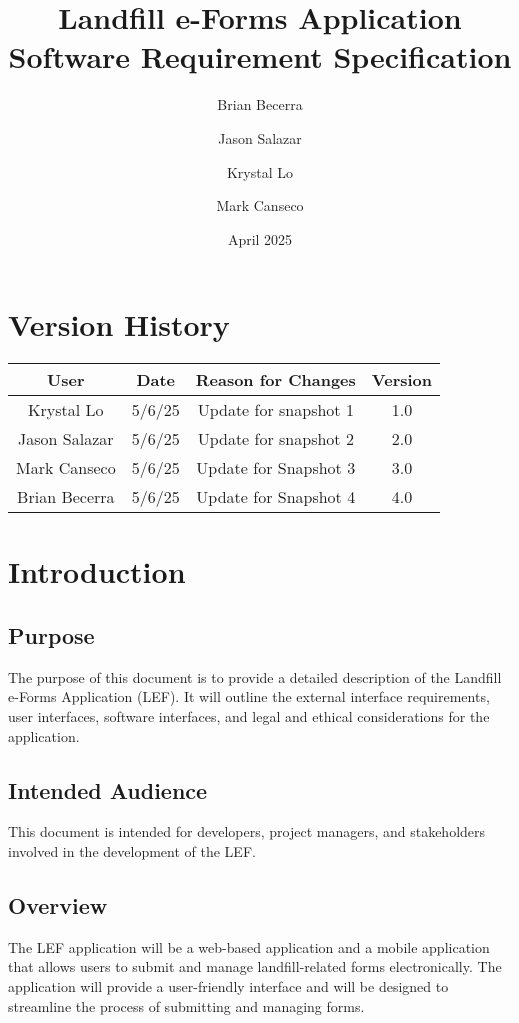 \documentclass[12pt]{article}
\title{Landfill e-Forms Application\\
Software Requirement Specification}
\author{
    Brian Becerra\\
    \and
    Jason Salazar\\
    \and
    Krystal Lo\\
    \and
    Mark Canseco\\
    }
\date{April 2025}
\begin{document}
\begin{titlepage}
\maketitle
\thispagestyle{empty}
\end{titlepage}

\thispagestyle{empty}
\tableofcontents
\newpage

\section*{Version History}
\begin{table}[ht]
    \centering
    \begin{tabular}{|c|c|c|c|}
    \hline
    \textbf{User} & \textbf{Date} & \textbf{Reason for Changes} & \textbf{Version}\\
    \hline
         Krystal Lo & 5/6/25  & Update for snapshot 1 & 1.0\\
    \hline
        Jason Salazar & 5/6/25 & Update for snapshot 2 & 2.0\\
    \hline
         Mark Canseco&  5/6/25& Update for Snapshot 3 & 3.0\\
    \hline
         Brian Becerra& 5/6/25 & Update for Snapshot 4 & 4.0\\
    \hline
    \end{tabular}
\end{table}
\newpage

\section{Introduction}
\subsection{Purpose}
The purpose of this document is to provide a detailed description of the Landfill e-Forms Application (LEF). It will outline the external interface requirements, user interfaces, software interfaces, and legal and ethical considerations for the application. 
\subsection{Intended Audience}
This document is intended for developers, project managers, and stakeholders involved in the development of the LEF.
\subsection{Overview}
The LEF application will be a web-based application and a mobile application that allows users to submit and manage landfill-related forms electronically. The application will provide a user-friendly interface and will be designed to streamline the process of submitting and managing forms.
\newpage
\end{document}
